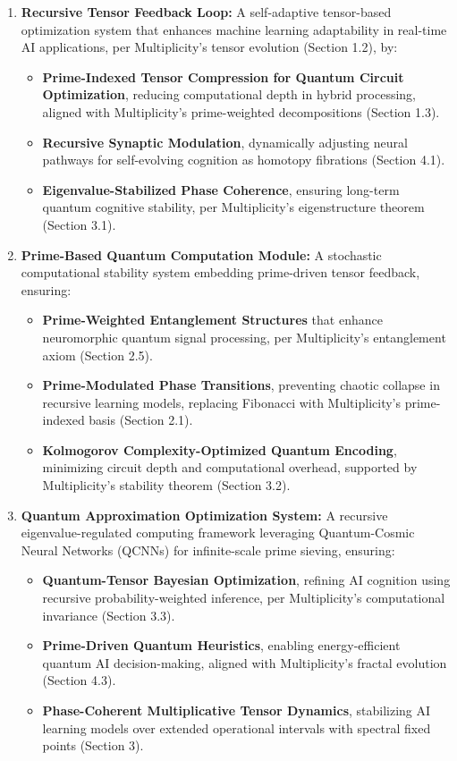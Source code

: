 \documentclass[12pt]{article}
\begin{document}
\begin{enumerate}
    \item \textbf{Recursive Tensor Feedback Loop:} A self-adaptive tensor-based optimization system that enhances machine learning adaptability in real-time AI applications, per Multiplicity’s tensor evolution (Section 1.2), by:
    \begin{itemize}
        \item \textbf{Prime-Indexed Tensor Compression for Quantum Circuit Optimization}, reducing computational depth in hybrid processing, aligned with Multiplicity’s prime-weighted decompositions (Section 1.3).
        \item \textbf{Recursive Synaptic Modulation}, dynamically adjusting neural pathways for self-evolving cognition as homotopy fibrations (Section 4.1).
        \item \textbf{Eigenvalue-Stabilized Phase Coherence}, ensuring long-term quantum cognitive stability, per Multiplicity’s eigenstructure theorem (Section 3.1).
    \end{itemize}

    \item \textbf{Prime-Based Quantum Computation Module:} A stochastic computational stability system embedding prime-driven tensor feedback, ensuring:
    \begin{itemize}
        \item \textbf{Prime-Weighted Entanglement Structures} that enhance neuromorphic quantum signal processing, per Multiplicity’s entanglement axiom (Section 2.5).
        \item \textbf{Prime-Modulated Phase Transitions}, preventing chaotic collapse in recursive learning models, replacing Fibonacci with Multiplicity’s prime-indexed basis (Section 2.1).
        \item \textbf{Kolmogorov Complexity-Optimized Quantum Encoding}, minimizing circuit depth and computational overhead, supported by Multiplicity’s stability theorem (Section 3.2).
    \end{itemize}

    \item \textbf{Quantum Approximation Optimization System:} A recursive eigenvalue-regulated computing framework leveraging Quantum-Cosmic Neural Networks (QCNNs) for infinite-scale prime sieving, ensuring:
    \begin{itemize}
        \item \textbf{Quantum-Tensor Bayesian Optimization}, refining AI cognition using recursive probability-weighted inference, per Multiplicity’s computational invariance (Section 3.3).
        \item \textbf{Prime-Driven Quantum Heuristics}, enabling energy-efficient quantum AI decision-making, aligned with Multiplicity’s fractal evolution (Section 4.3).
        \item \textbf{Phase-Coherent Multiplicative Tensor Dynamics}, stabilizing AI learning models over extended operational intervals with spectral fixed points (Section 3).
    \end{itemize}
\end{enumerate}
\end{document}
